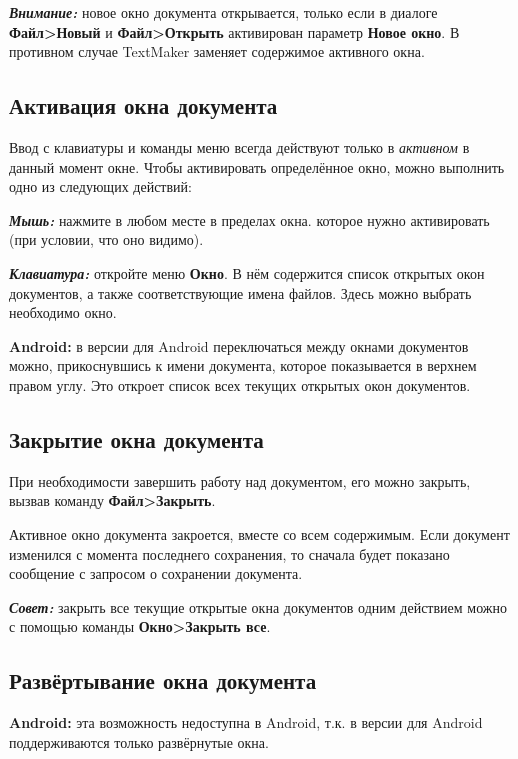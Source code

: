 ﻿\documentclass[a4paper,10pt]{article}
\begin{document}
\begin{mdframed}[backgroundcolor=blue!10]
\textbf{\textit{Внимание:}} новое окно документа открывается, только если в диалоге \textbf{Файл>Новый} и \textbf{Файл>Открыть} активирован параметр \textbf{Новое окно}. В противном случае TextMaker заменяет содержимое активного окна.
\end{mdframed}

\subsection{Активация окна документа}
Ввод с клавиатуры и команды меню всегда действуют только в \textit{активном} в данный момент окне. Чтобы активировать определённое окно, можно выполнить одно из следующих действий:

\textbf{\textit{Мышь:}} нажмите в любом месте в пределах окна. которое нужно активировать (при условии, что оно видимо).

\textbf{\textit{Клавиатура:}} откройте меню \textbf{Окно}. В нём содержится список открытых окон документов, а также соответствующие имена файлов. Здесь можно выбрать необходимо окно.

\textbf{Android:} в версии для Android переключаться между окнами документов можно, прикоснувшись к имени документа, которое показывается в верхнем правом углу. Это откроет список всех текущих открытых окон документов.

\subsection{Закрытие окна документа}
При необходимости завершить работу над документом, его можно закрыть, вызвав команду \textbf{Файл>Закрыть}.

Активное окно документа закроется, вместе со всем содержимым. Если документ изменился с момента последнего сохранения, то сначала будет показано сообщение с запросом о сохранении документа.

\begin{mdframed}[backgroundcolor=blue!10]
\textbf{\textit{Совет:}} закрыть все текущие открытые окна документов одним действием можно с помощью команды \textbf{Окно>Закрыть все}.
\end{mdframed}

\subsection{Развёртывание окна документа}
\begin{mdframed}[backgroundcolor=blue!10]
\textbf{Android:} эта возможность недоступна в Android, т.к. в версии для Android поддерживаются только развёрнутые окна.
\end{mdframed}
\end{document}
